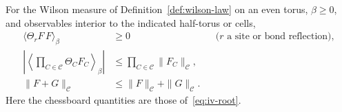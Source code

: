 \begin{lemma}\label{lem:iv-reflection}
For the Wilson measure of Definition~\ref{def:wilson-law} on an even torus, $\beta\ge0$, and observables interior to the indicated half-torus or cells,
\begin{align}
 \langle\Theta_r F\,F\rangle_\beta&\ge0
 &&\text{($r$ a site or bond reflection)},\label{eq:iv-lattice-rp}\\
 \left|\left\langle\prod_{C\in\mathcal C}\Theta_C F_C\right\rangle_\beta\right|
 &\le\prod_{C\in\mathcal C}\|F_C\|_{\mathcal C},\label{eq:iv-chessboard}\\
 \|F+G\|_{\mathcal C}&\le\|F\|_{\mathcal C}+\|G\|_{\mathcal C}.\nonumber
\end{align}
Here the chessboard quantities are those of~\eqref{eq:iv-root}.
\end{lemma}

